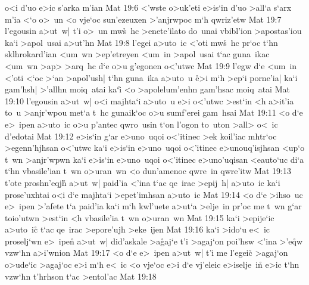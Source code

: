 o<i
d'uo
e>ic
s'arka
m'ian\bibvsend
\vs Mat 19:6
<'wste
o>uk'eti
e>is`in
d'uo
>all`a
s`arx
m'ia
<`o
o>~un
<o
vje`oc
sun'ezeuxen
>'anjrwpoc
m`h
qwriz'etw\bibvsend
\vs Mat 19:7
l'egousin
a>ut~w|
t'i
o>~un
mw\r{s}~hc
>enete'ilato
do~unai
vbibl'ion
>apostas'iou
ka`i
>apol~usai
a>ut'hn\bibvsend
\vs Mat 19:8
l'egei
a>uto~ic
<'oti
mw\r{s}~hc
pr`oc
t`hn
sklhrokard'ian
<um~wn
>ep'etreyen
<um~in
>apol~usai
t`ac
guna~ikac
<um~wn
>ap>
>arq~hc
d`e
o>u
g'egonen
o<'utwc\bibvsend
\vs Mat 19:9
l'egw
d`e
<um~in
<'oti
<`oc
>`an
>apol'ush|
t`hn
guna~ika
a>uto~u
\r{e}>i
m`h
>ep`i
porne'ia|
ka`i
gam'hsh|
>'allhn
moiq~atai
ka`i\r{}
<o
>apolelum'enhn
gam'hsac
moiq~atai\bibvsend
\vs Mat 19:10
l'egousin
a>ut~w|
o<i
majhta`i
a>uto~u
e>i
o<'utwc
>est`in
<h
a>it'ia
to~u
>anjr'wpou
met`a
t~hc
gunaik`oc
o>u
sumf'erei
gam~hsai\bibvsend
\vs Mat 19:11
<o
d`e
e>~ipen
a>uto~ic
o>u
p'antec
qwro~usin
t`on
l'ogon
to~uton
>all>
o<~ic
d'edotai\bibvsend
\vs Mat 19:12
e>is`in
g`ar
e>uno~uqoi
o<'itinec
>ek
koil'iac
mhtr`oc
>egenn'hjhsan
o<'utwc
ka`i
e>is`in
e>uno~uqoi
o<'itinec
e>unouq'isjhsan
<up`o
t~wn
>anjr'wpwn
ka`i
e>is`in
e>uno~uqoi
o<'itinec
e>uno'uqisan
<eauto`uc
di`a
t`hn
vbasile'ian
t~wn
o>uran~wn
<o
dun'amenoc
qwre~in
qwre'itw\bibvsend
\vs Mat 19:13
t'ote
proshn'eqj\r{h}
a>ut~w|
paid'ia
<'ina
t`ac
qe~irac
>epij~h|
a>uto~ic
ka`i
prose'uxhtai
o<i
d`e
majhta`i
>epet'imhsan
a>uto~ic\bibvsend
\vs Mat 19:14
<o
d`e
>ihso~uc
e>~ipen
>'afete
t`a
paid'ia
ka`i
m`h
kwl'uete
a>ut`a
>elje~in
pr'oc
me
t~wn
g`ar
toio'utwn
>est`in
<h
vbasile'ia
t~wn
o>uran~wn\bibvsend
\vs Mat 19:15
ka`i
>epije`ic
a>uto~ic\r{}
t`ac
qe~irac
>epore'ujh
>eke~ijen\bibvsend
\vs Mat 19:16
ka`i
>ido`u
e<~ic
proselj`wn
e>~ipen\r{}
a>ut~w|
did'askale
>a\r{g}aj`e
t'i
>agaj`on
poi'hsw
<'ina
>'e\r{q}w
vzw`hn
a>i'wnion\bibvsend
\vs Mat 19:17
<o
d`e
e>~ipen
a>ut~w|
t'i
me
l'egeic\r{}
>agaj`on
o>ude`ic
>agaj`oc
e>i
m`h
e<~ic
<o
vje`oc
e>i
d`e
vj'eleic
e>iselje~in\r{}
e>ic
t`hn
vzw`hn
t'hrhson
t`ac
>entol'ac\bibvsend
\vs Mat 19:18
